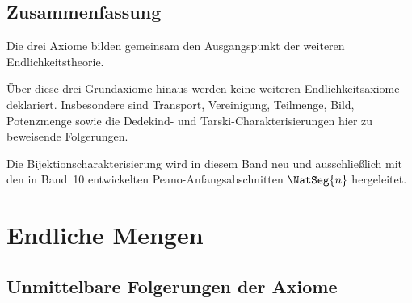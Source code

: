 \documentclass[main.tex]{subfiles}
\begin{document}

\section{Zusammenfassung}

Die drei Axiome bilden gemeinsam den Ausgangspunkt der weiteren
Endlichkeitstheorie.


Über diese drei Grundaxiome hinaus werden keine weiteren
Endlichkeitsaxiome deklariert. Insbesondere sind Transport, Vereinigung,
Teilmenge, Bild, Potenzmenge sowie die Dedekind- und
Tarski-Charakterisierungen hier zu beweisende Folgerungen.

Die Bijektionscharakterisierung wird in diesem Band neu und ausschließlich mit
den in Band~10 entwickelten Peano-Anfangsabschnitten \(\NatSeg{n}\)
hergeleitet.

\chapter{Endliche Mengen}

\section{Unmittelbare Folgerungen der Axiome}
\end{document}
